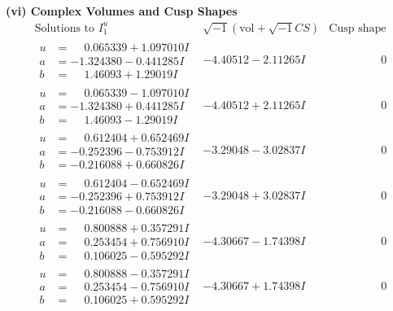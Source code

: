 \documentclass[1p]{elsarticle_modified}
\theoremstyle{definition}
\newcommand{\I}{\sqrt{-1}}
\begin{document}
\newpage\flushleft \textbf{(vi) Complex Volumes and Cusp Shapes}
$$\begin{array}{c|c|c}  
\text{Solutions to }I^u_{1}& \I (\text{vol} + \sqrt{-1}CS) & \text{Cusp shape}\\
 \hline 
\begin{aligned}
u &= \phantom{-}0.065339 + 1.097010 I \\
a &= -1.324380 - 0.441285 I \\
b &= \phantom{-}1.46093 + 1.29019 I\end{aligned}
 & -4.40512 - 2.11265 I & \phantom{-0.000000 } 0 \\ \hline\begin{aligned}
u &= \phantom{-}0.065339 - 1.097010 I \\
a &= -1.324380 + 0.441285 I \\
b &= \phantom{-}1.46093 - 1.29019 I\end{aligned}
 & -4.40512 + 2.11265 I & \phantom{-0.000000 } 0 \\ \hline\begin{aligned}
u &= \phantom{-}0.612404 + 0.652469 I \\
a &= -0.252396 - 0.753912 I \\
b &= -0.216088 + 0.660826 I\end{aligned}
 & -3.29048 - 3.02837 I & \phantom{-0.000000 } 0 \\ \hline\begin{aligned}
u &= \phantom{-}0.612404 - 0.652469 I \\
a &= -0.252396 + 0.753912 I \\
b &= -0.216088 - 0.660826 I\end{aligned}
 & -3.29048 + 3.02837 I & \phantom{-0.000000 } 0 \\ \hline\begin{aligned}
u &= \phantom{-}0.800888 + 0.357291 I \\
a &= \phantom{-}0.253454 + 0.756910 I \\
b &= \phantom{-}0.106025 - 0.595292 I\end{aligned}
 & -4.30667 - 1.74398 I & \phantom{-0.000000 } 0 \\ \hline\begin{aligned}
u &= \phantom{-}0.800888 - 0.357291 I \\
a &= \phantom{-}0.253454 - 0.756910 I \\
b &= \phantom{-}0.106025 + 0.595292 I\end{aligned}
 & -4.30667 + 1.74398 I & \phantom{-0.000000 } 0 \\ \hline\begin{aligned}

\end{aligned}
\end{array}$$
\end{document}

